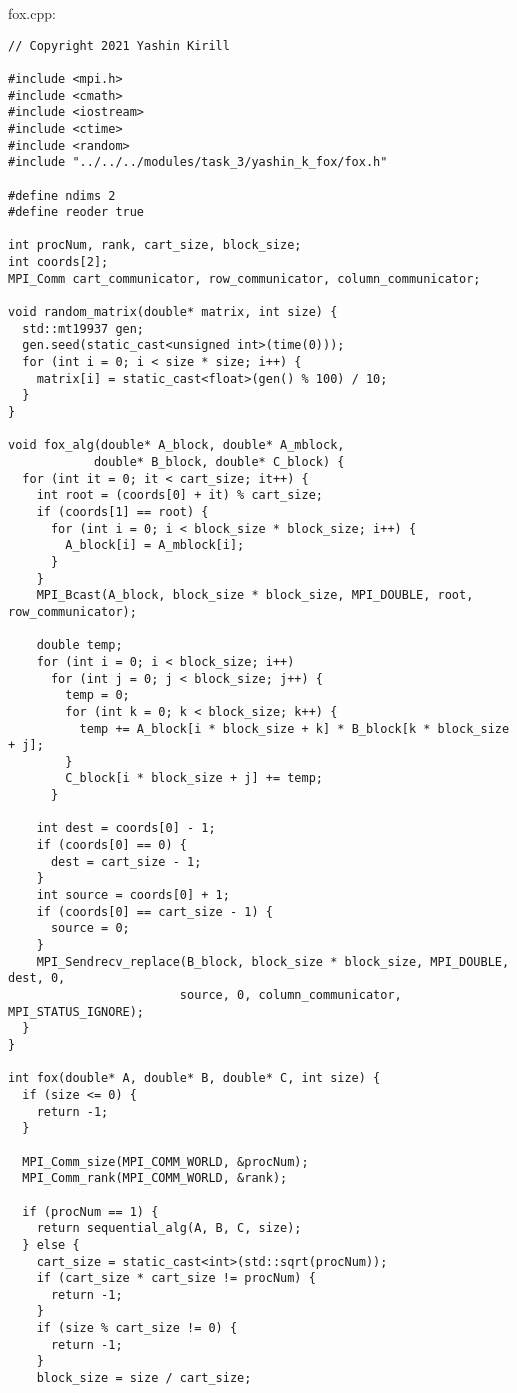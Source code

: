 \documentclass{report}
\begin{document}
\par fox.cpp:
\begin{lstlisting}
// Copyright 2021 Yashin Kirill

#include <mpi.h>
#include <cmath>
#include <iostream>
#include <ctime>
#include <random>
#include "../../../modules/task_3/yashin_k_fox/fox.h"

#define ndims 2
#define reoder true

int procNum, rank, cart_size, block_size;
int coords[2];
MPI_Comm cart_communicator, row_communicator, column_communicator;

void random_matrix(double* matrix, int size) {
  std::mt19937 gen;
  gen.seed(static_cast<unsigned int>(time(0)));
  for (int i = 0; i < size * size; i++) {
    matrix[i] = static_cast<float>(gen() % 100) / 10;
  }
}

void fox_alg(double* A_block, double* A_mblock,
            double* B_block, double* C_block) {
  for (int it = 0; it < cart_size; it++) {
    int root = (coords[0] + it) % cart_size;
    if (coords[1] == root) {
      for (int i = 0; i < block_size * block_size; i++) {
        A_block[i] = A_mblock[i];
      }
    }
    MPI_Bcast(A_block, block_size * block_size, MPI_DOUBLE, root, row_communicator);

    double temp;
    for (int i = 0; i < block_size; i++)
      for (int j = 0; j < block_size; j++) {
        temp = 0;
        for (int k = 0; k < block_size; k++) {
          temp += A_block[i * block_size + k] * B_block[k * block_size + j];
        }
        C_block[i * block_size + j] += temp;
      }

    int dest = coords[0] - 1;
    if (coords[0] == 0) {
      dest = cart_size - 1;
    }
    int source = coords[0] + 1;
    if (coords[0] == cart_size - 1) {
      source = 0;
    }
    MPI_Sendrecv_replace(B_block, block_size * block_size, MPI_DOUBLE, dest, 0,
                        source, 0, column_communicator, MPI_STATUS_IGNORE);
  }
}

int fox(double* A, double* B, double* C, int size) {
  if (size <= 0) {
    return -1;
  }

  MPI_Comm_size(MPI_COMM_WORLD, &procNum);
  MPI_Comm_rank(MPI_COMM_WORLD, &rank);

  if (procNum == 1) {
    return sequential_alg(A, B, C, size);
  } else {
    cart_size = static_cast<int>(std::sqrt(procNum));
    if (cart_size * cart_size != procNum) {
      return -1;
    }
    if (size % cart_size != 0) {
      return -1;
    }
    block_size = size / cart_size;


\end{lstlisting}
\end{document}
